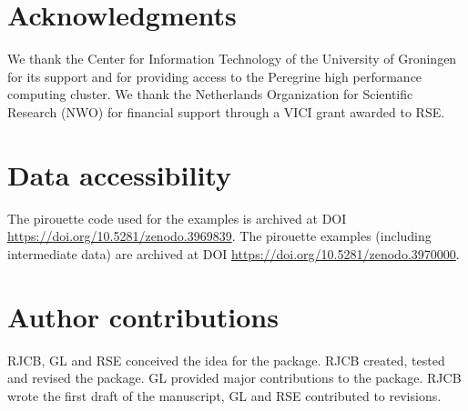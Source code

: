 \section{Acknowledgments}
\label{subsec:acknowledgments}

We thank the Center for Information Technology of the University 
of Groningen for its support and for providing access to the Peregrine 
high performance computing cluster. 
We thank the Netherlands 
Organization for Scientific Research (NWO) for financial support 
through a VICI grant awarded to RSE.

\section{Data accessibility}
\label{subsec:data_accessibility}

The pirouette code used for the examples 
is archived at DOI \url{https://doi.org/10.5281/zenodo.3969839}.
The pirouette examples (including intermediate data) are archived at 
DOI \url{https://doi.org/10.5281/zenodo.3970000}.

\section{Author contributions}
\label{subsec:author_contributions}

RJCB, GL and RSE conceived the idea for the package. 
RJCB created, tested and revised the package.
GL provided major contributions to the package.
RJCB wrote the first draft of the manuscript, 
GL and RSE contributed to revisions.

%
%
%
%

